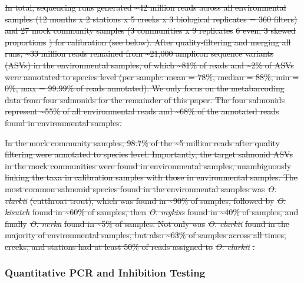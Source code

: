 \documentclass[
]{article}
\providecommand{\DIFdeltex}[1]{{\protect\color{red}\sout{#1}}}                      %
\providecommand{\DIFdelbegin}{} %
\providecommand{\DIFdelend}{} %
\providecommand{\DIFdel}[1]{\texorpdfstring{\DIFdeltex{#1}}{}} %
\newcommand{\DIFscaledelfig}{0.5}
\newlength{\DIFdelgraphicswidth} %
\newlength{\DIFdelgraphicsheight} %
\newcommand{\DIFdelincludegraphics}[2][]{%
\sbox{\DIFdelgraphicsbox}{\DIFOincludegraphics[#1]{#2}}%
\settoboxwidth{\DIFdelgraphicswidth}{\DIFdelgraphicsbox} %
\settoboxtotalheight{\DIFdelgraphicsheight}{\DIFdelgraphicsbox} %
\scalebox{\DIFscaledelfig}{%
\parbox[b]{\DIFdelgraphicswidth}{\usebox{\DIFdelgraphicsbox}\\[-\baselineskip] \rule{\DIFdelgraphicswidth}{0em}}\llap{\resizebox{\DIFdelgraphicswidth}{\DIFdelgraphicsheight}{%
\setlength{\unitlength}{\DIFdelgraphicswidth}%
\begin{picture}(1,1)%
\thicklines\linethickness{2pt} %
{\color[rgb]{1,0,0}\put(0,0){\framebox(1,1){}}}%
{\color[rgb]{1,0,0}\put(0,0){\line( 1,1){1}}}%
{\color[rgb]{1,0,0}\put(0,1){\line(1,-1){1}}}%
\end{picture}%
}\hspace*{3pt}}} %
} %
\DeclareRobustCommand{\DIFdelbegin}{\DIFOdelbegin \let\includegraphics\DIFdelincludegraphics} %
\DeclareRobustCommand{\DIFdelend}{\DIFOaddend \let\includegraphics\DIFOincludegraphics} %
\begin{document}
\DIFdelbegin \DIFdel{In total, sequencing runs generated \textasciitilde42 million reads
across all environmental samples (12 months x 2 stations x 5 creeks x 3
biological replicates = 360 filters) and 27 mock community samples (3
communities x 9 replicates }%
\DIFdel{6 even, 3 skewed proportions}%
\DIFdel{) for
calibration (see below). After quality-filtering and merging all runs,
\textasciitilde33 million reads remained from \textasciitilde21,000
amplicon sequence variants (ASVs) in the environmental samples, of which
\textasciitilde81\% of reads and \textasciitilde2\% of ASVs were
annotated to species level (per sample: mean = 78\%, median = 88\%, min
= 0\%, max = 99.99\% of reads annotated). We only focus on the
metabarcoding data from four salmonids for the remainder of this paper.
The four salmonids represent \textasciitilde55\% of all environmental
reads and \textasciitilde68\% of the annotated reads found in
environmental samples.
}%

\DIFdel{In the mock community samples, 98.7\% of the \textasciitilde5 million
reads after quality filtering were annotated to species level.
Importantly, the target salmonid ASVs in the mock communities were found
in environmental samples, unambiguously linking the taxa in calibration
samples with those in environmental samples. The most common salmonid
species found in the environmental samples was }\emph{\DIFdel{O. clarkii}}
\DIFdel{(cutthroat trout), which was found in \textasciitilde90\% of samples,
followed by }\emph{\DIFdel{O. kisutch}} %
\DIFdel{found in \textasciitilde60\% of samples,
then }\emph{\DIFdel{O. mykiss}} %
\DIFdel{found in \textasciitilde40\% of samples, and
finally }\emph{\DIFdel{O. nerka}} %
\DIFdel{found in \textasciitilde5\% of samples. Not only
was }\emph{\DIFdel{O. clarkii}} %
\DIFdel{found in the majority of environmental samples,
but also \textasciitilde63\% of samples across all times, creeks, and
stations had at least 50\% of reads assigned to }\emph{\DIFdel{O. clarkii}}%
\DIFdel{.
}%

\DIFdelend \hypertarget{quantitative-pcr-and-inhibition-testing}{%
\subsubsection{Quantitative PCR and Inhibition
Testing}\label{quantitative-pcr-and-inhibition-testing}}
\end{document}
